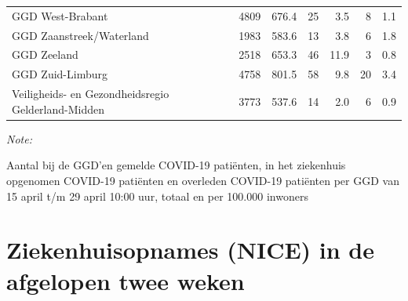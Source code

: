 \documentclass[
  english,
  man,floatsintext]{apa6}
\begin{document}
\begin{table}
\begin{threeparttable}
\begin{tabular}{lrrrrrr}
GGD West-Brabant & 4809 & 676.4 & 25 & 3.5 & 8 & 1.1\\
GGD Zaanstreek/Waterland & 1983 & 583.6 & 13 & 3.8 & 6 & 1.8\\
GGD Zeeland & 2518 & 653.3 & 46 & 11.9 & 3 & 0.8\\
GGD Zuid-Limburg & 4758 & 801.5 & 58 & 9.8 & 20 & 3.4\\
Veiligheids- en Gezondheidsregio Gelderland-Midden & 3773 & 537.6 & 14 & 2.0 & 6 & 0.9\\
\bottomrule
\end{tabular}
\begin{tablenotes}
\item \textit{Note: } 
\item Aantal bij de GGD’en gemelde COVID-19 patiënten, in het ziekenhuis opgenomen COVID-19 patiënten en overleden COVID-19 patiënten per GGD van 15 april t/m 29 april 10:00 uur, totaal en per 100.000 inwoners
\end{tablenotes}
\end{threeparttable}
\endgroup{}
\end{table}

\newpage

\hypertarget{ziekenhuisopnames-nice-in-de-afgelopen-twee-weken}{%
\section{Ziekenhuisopnames (NICE) in de afgelopen twee weken}\label{ziekenhuisopnames-nice-in-de-afgelopen-twee-weken}}
\end{document}
